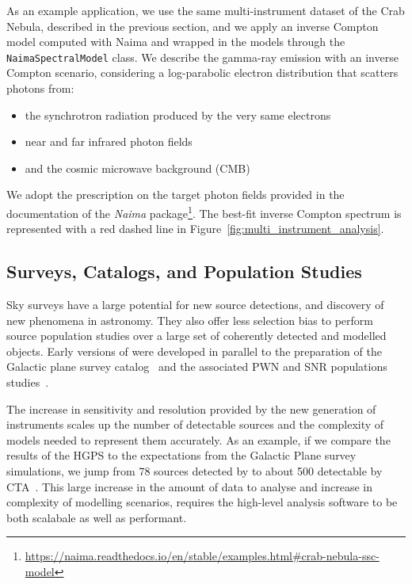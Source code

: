 \documentclass[longauth]{aa}
\newcommand{\code}[1]{\texttt{#1}}
\begin{document}
As an example application, we use the same multi-instrument
dataset of the Crab Nebula, described in the previous section,
and we apply an inverse
Compton model computed with Naima and wrapped in the \gammapy models
through the \code{NaimaSpectralModel} class. We describe the gamma-ray emission 
with an inverse Compton scenario, considering a log-parabolic
electron distribution that scatters photons from:
%
\begin{itemize}
	\item the synchrotron radiation produced by
	the very same electrons
	\item near and far infrared photon fields
	\item and the cosmic microwave background (CMB)
\end{itemize}
%
We adopt the prescription on the target photon fields provided in the documentation of the \textit{Naima}
package\footnote{\url{https://naima.readthedocs.io/en/stable/examples.html\#crab-nebula-ssc-model}}.
The best-fit inverse Compton spectrum is represented with a red dashed line in
Figure~\ref{fig:multi_instrument_analysis}.

\subsection{Surveys, Catalogs, and Population Studies}
\label{ssec:surveys-catalogs-and-population-studies}

Sky surveys have a large potential for new source detections, and discovery of new phenomena
 in \gammaray astronomy. They also offer less selection bias to perform
source population studies over a large set of coherently detected and modelled objects.
Early versions of \gammapy were developed in parallel to the preparation of
the \hess Galactic plane survey catalog~\citep[HGPS, ][]{2018A&A...612A...1H} and
the associated PWN and SNR populations studies~\citep{2018A&A...612A...2H,
	2018A&A...612A...3H}. 

The increase in sensitivity and resolution provided by the new generation of
instruments scales up the number of detectable sources and the complexity of 
models needed to represent them accurately. As an example, if we compare the
results of the HGPS to the expectations from the \cta Galactic Plane survey
simulations, we jump from 78 sources detected by \hess to about 500 detectable by
CTA~\citep{Remy2021}. This large increase in the amount of data to analyse
and increase in complexity of modelling scenarios, requires the high-level
analysis software to be both scalabale as well as performant. 
\end{document}
